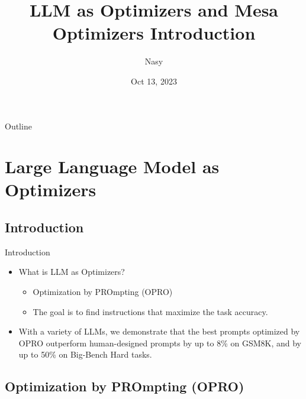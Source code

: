 \documentclass[aspectratio=1610,xcolor={dvipsnames},hyperref={colorlinks,unicode,linkcolor=violet,anchorcolor=BlueViolet,citecolor=YellowOrange,filecolor=black,urlcolor=Aquamarine}]{beamer}
\author{Nasy}
\date{Oct 13, 2023}
\title{LLM as Optimizers and Mesa Optimizers Introduction}
\begin{document}
\maketitle
\begin{frame}{Outline}
\setcounter{tocdepth}{1}
\tableofcontents
\end{frame}

\setcounter{tocdepth}{2}
\section{Large Language Model as Optimizers}
\label{sec:org5ea8b9b}

\subsection{Introduction}
\label{sec:orge4454b4}

\begin{frame}[label={sec:org4eeaa5c}]{Introduction}
\begin{itemize}
\item What is LLM as Optimizers?
\begin{itemize}
\item Optimization by PROmpting (OPRO)
\item The goal is to find instructions that maximize the task accuracy.
\end{itemize}
\item With a variety of LLMs, we demonstrate that the best prompts optimized by OPRO outperform human-designed prompts by up to 8\% on GSM8K, and by up to 50\% on Big-Bench Hard tasks.
\end{itemize}
\end{frame}
\subsection{Optimization by PROmpting (OPRO)}
\label{sec:org2107dba}
\end{document}
